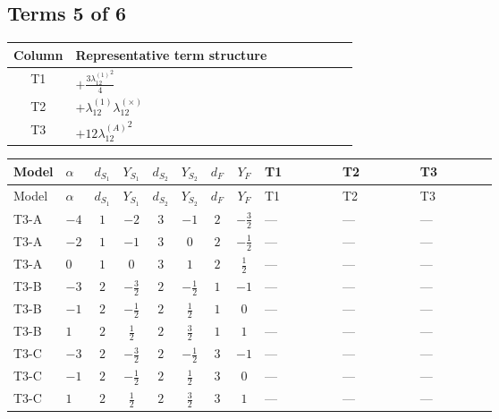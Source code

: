 \documentclass[8pt]{article}
\begin{document}
\begin{landscape}
\subsection*{Terms 5 of 6}
\begin{center}
\begin{tabular}{@{}c >{\raggedright\arraybackslash}p{0.82\linewidth}@{}}
\toprule
Column & Representative term structure \\
\midrule
T1 & \(\displaystyle +\frac{3 {\lambda_{12}^{(1)}}^2}{4}\) \\
\midrule
T2 & \(\displaystyle +{\lambda_{12}^{(1)}} {\lambda_{12}^{(\times)}}\) \\
\midrule
T3 & \(\displaystyle +12 {\lambda_{12}^{(A)}}^2\) \\
\midrule
\bottomrule
\end{tabular}
\end{center}
\smallskip
\tiny
\begin{longtable}{@{}llcccccc >{\raggedright\arraybackslash}p{0.21\linewidth} >{\raggedright\arraybackslash}p{0.21\linewidth} >{\raggedright\arraybackslash}p{0.21\linewidth}@{}}
\toprule
Model & $\alpha$ & $d_{S_1}$ & $Y_{S_1}$ & $d_{S_2}$ & $Y_{S_2}$ & $d_F$ & $Y_F$ & T1 & T2 & T3 \\
\midrule
\endfirsthead
\toprule
Model & $\alpha$ & $d_{S_1}$ & $Y_{S_1}$ & $d_{S_2}$ & $Y_{S_2}$ & $d_F$ & $Y_F$ & T1 & T2 & T3 \\
\midrule
\endhead
T3-A & $-4$ & $1$ & $-2$ & $3$ & $-1$ & $2$ & $-\frac{3}{2}$ & --- & --- & --- \\
\midrule
T3-A & $-2$ & $1$ & $-1$ & $3$ & $0$ & $2$ & $-\frac{1}{2}$ & --- & --- & --- \\
\midrule
T3-A & $0$ & $1$ & $0$ & $3$ & $1$ & $2$ & $\frac{1}{2}$ & --- & --- & --- \\
\midrule
T3-B & $-3$ & $2$ & $-\frac{3}{2}$ & $2$ & $-\frac{1}{2}$ & $1$ & $-1$ & --- & --- & --- \\
\midrule
T3-B & $-1$ & $2$ & $-\frac{1}{2}$ & $2$ & $\frac{1}{2}$ & $1$ & $0$ & --- & --- & --- \\
\midrule
T3-B & $1$ & $2$ & $\frac{1}{2}$ & $2$ & $\frac{3}{2}$ & $1$ & $1$ & --- & --- & --- \\
\midrule
T3-C & $-3$ & $2$ & $-\frac{3}{2}$ & $2$ & $-\frac{1}{2}$ & $3$ & $-1$ & --- & --- & --- \\
\midrule
T3-C & $-1$ & $2$ & $-\frac{1}{2}$ & $2$ & $\frac{1}{2}$ & $3$ & $0$ & --- & --- & --- \\
\midrule
T3-C & $1$ & $2$ & $\frac{1}{2}$ & $2$ & $\frac{3}{2}$ & $3$ & $1$ & --- & --- & --- \\

\end{longtable}
\end{landscape}
\end{document}
